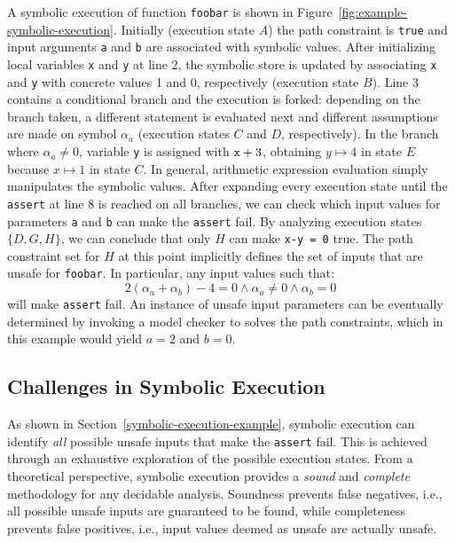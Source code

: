 \noindent A symbolic execution of function {\tt foobar} is shown in Figure~\ref{fig:example-symbolic-execution}. Initially (execution state $A$) the path constraint is {\tt true} and input arguments {\tt a} and {\tt b} are associated with symbolic values. 
After initializing local variables {\tt x} and {\tt y} at line 2, the symbolic store is updated by associating {\tt x} and {\tt y} with concrete values 1 and 0, respectively (execution state $B$). Line 3 contains a conditional branch and the execution is forked: depending on the branch taken, a different statement is evaluated next and different assumptions are made on symbol $\alpha_a$ (execution states $C$ and $D$, respectively). In the branch where $\alpha_a\neq 0$, variable {\tt y} is assigned with ${\tt x}+3$, obtaining $y\mapsto 4$ in state $E$ because $x\mapsto 1$ in state $C$. In general, arithmetic expression evaluation simply manipulates the symbolic values.
After expanding every execution state until the {\tt assert} at line 8 is reached on all branches, we can check which input values for parameters {\tt a} and {\tt b} can make the {\tt assert} fail. By analyzing execution states $\{D,G,H\}$, we can conclude that only $H$ can make {\tt x-y = 0} true. The path constraint set for $H$ at this point implicitly defines the set of inputs that are unsafe for {\tt foobar}. 
In particular, any input values such that:
 \[ 2(\alpha_a+\alpha_b)-4 = 0 \wedge \alpha_a \neq 0 \wedge \alpha_b = 0 \]
will make {\tt assert} fail. An instance of unsafe input parameters can be eventually determined by invoking a model checker to solves the path constraints, which in this example would yield $a = 2$ and $b = 0$. 


\subsection{Challenges in Symbolic Execution}
\label{example-discussion}

As shown in Section~\ref{symbolic-execution-example}, symbolic execution can identify {\em all} possible unsafe inputs that make the {\tt assert} fail. This is achieved through an exhaustive exploration of the possible execution states. From a theoretical perspective, symbolic execution provides a {\em sound} and {\em complete} methodology for any decidable analysis. Soundness prevents false negatives, i.e., all possible unsafe inputs are guaranteed to be found, while completeness prevents false positives, i.e.,  input values deemed as unsafe are actually unsafe. 

